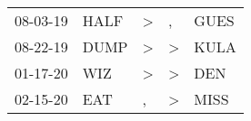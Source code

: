 \begin{supertabular}{p{0.07\textwidth}p{0.06\textwidth}p{0.02\textwidth}p{0.02\textwidth}p{0.06\textwidth}}
          08-03-19\textsuperscript{} &           HALF\textsuperscript{} &     \textgreater &             , &           GUES\textsuperscript{} \\
          08-22-19\textsuperscript{} &           DUMP\textsuperscript{} &     \textgreater &  \textgreater &           KULA\textsuperscript{} \\
          01-17-20\textsuperscript{} &            WIZ\textsuperscript{} &     \textgreater &  \textgreater &            DEN\textsuperscript{} \\
          02-15-20\textsuperscript{} &            EAT\textsuperscript{} &                , &  \textgreater &           MISS\textsuperscript{} \\
\end{supertabular}
